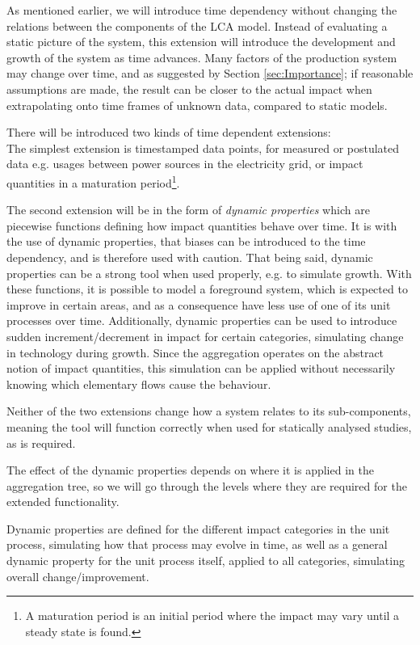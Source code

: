 As mentioned earlier, we will introduce time dependency without changing the relations between the components of the LCA model. Instead of evaluating a static picture of the system, this extension will introduce the development and growth of the system as time advances. Many factors of the production system may change over time, and as suggested by Section \ref{sec:Importance}; if reasonable assumptions are made, the result can be closer to the actual impact when extrapolating onto time frames of unknown data, compared to static models.

There will be introduced two kinds of time dependent extensions: \\
The simplest extension is timestamped data points, for measured or postulated data e.g. usages between power sources in the electricity grid, or impact quantities in a maturation period\footnote{A maturation period is an initial period where the impact may vary until a steady state is found.}.

The second extension will be in the form of \emph{dynamic properties} which are piecewise functions defining how impact quantities behave over time. It is with the use of dynamic properties, that biases can be introduced to the time dependency, and is therefore used with caution. That being said, dynamic properties can be a strong tool when used properly, e.g. to simulate growth. With these functions, it is possible to model a foreground system, which is expected to improve in certain areas, and as a consequence have less use of one of its unit processes over time. Additionally, dynamic properties can be used to introduce sudden increment/decrement in impact for certain categories, simulating change in technology during growth. Since the aggregation operates on the abstract notion of impact quantities, this simulation can be applied without necessarily knowing which elementary flows cause the behaviour.

Neither of the two extensions change how a system relates to its sub-components, meaning the tool will function correctly when used for statically analysed studies, as is required.

\vspace{1cm}
The effect of the dynamic properties depends on where it is applied in the aggregation tree, so we will go through the levels where they are required for the extended functionality.

Dynamic properties are defined for the different impact categories in the unit process, simulating how that process may evolve in time, as well as a general dynamic property for the unit process itself, applied to all categories, simulating overall change/improvement.

